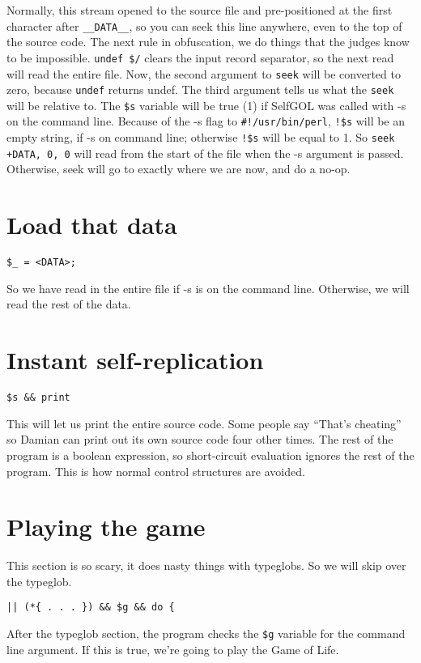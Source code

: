 \documentclass{article}
\begin{document}
Normally, this stream opened to the source file and pre-positioned at
the first character after \verb"__DATA__", so you can seek this
line anywhere, even to the top of the source code.  The next rule in
obfuscation, we do things that the judges know to be impossible.
\verb"undef $/" clears the input record separator, 
so the next read will read the entire file.
Now, the second argument to \verb"seek" will be converted to zero, 
because \verb"undef" returns undef.  The
third argument tells us what the \verb"seek" will be relative to.  The
\verb"$s" variable will be true (1) if SelfGOL was called with -s on
the command line.  Because of the -s flag to \verb"#!/usr/bin/perl", 
\verb"!$s"
will be an empty string, if -s on command line; otherwise \verb"!$s"
will be equal to 1.  So \verb"seek +DATA, 0, 0" will read 
from the start of the file  when the -s argument is passed.  Otherwise, seek
will go to exactly where we are now, and do a no-op.

\section{Load that data}
\begin{verbatim}
$_ = <DATA>;
\end{verbatim}
So we have read in the entire file if -s is on the command line.  
Otherwise, we will read the rest of the data.

\section{Instant self-replication}
\begin{verbatim}
$s && print
\end{verbatim}
This will let us print the entire source code.  Some
people say ``That's cheating'' so Damian can print out its own source
code four other times.  The rest of the program is a boolean expression, so
short-circuit evaluation ignores the rest of the program.  This is how
normal control structures are avoided.

\section{Playing the game}
This section is so scary, it does nasty things with typeglobs.  So we
will skip over the typeglob.
\begin{verbatim}
|| (*{ . . . }) && $g && do {
\end{verbatim}

After the typeglob section, the program checks the \verb"$g" variable
for the command line argument.  If this is true, we're going to play the
Game of Life.
\end{document}
